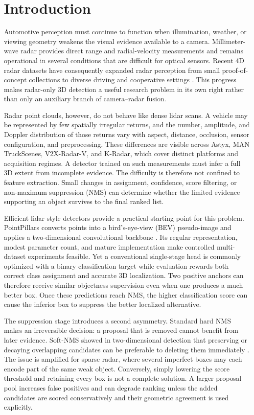 \documentclass[final,5p,times]{elsarticle}
\begin{document}
\section{Introduction}

Automotive perception must continue to function when illumination, weather,
or viewing geometry weakens the visual evidence available to a camera.
Millimeter-wave radar provides direct range and radial-velocity measurements
and remains operational in several conditions that are difficult for optical
sensors. Recent 4D radar datasets have consequently expanded radar perception
from small proof-of-concept collections to diverse driving and cooperative
settings \cite{paek2022kradar,yang2024v2xradar}. This progress makes
radar-only 3D detection a useful research problem in its own right rather than
only an auxiliary branch of camera--radar fusion.

Radar point clouds, however, do not behave like dense lidar scans. A vehicle
may be represented by few spatially irregular returns, and the number,
amplitude, and Doppler distribution of those returns vary with aspect,
distance, occlusion, sensor configuration, and preprocessing. These
differences are visible across Astyx, MAN TruckScenes, V2X-Radar-V, and
K-Radar, which cover distinct platforms and acquisition regimes. A detector
trained on such measurements must infer a full 3D extent from incomplete
evidence. The difficulty is therefore not confined to feature extraction.
Small changes in assignment, confidence, score filtering, or non-maximum
suppression (NMS) can determine whether the limited evidence supporting an
object survives to the final ranked list.

Efficient lidar-style detectors provide a practical starting point for this
problem. PointPillars converts points into a bird's-eye-view (BEV) pseudo-image
and applies a two-dimensional convolutional backbone
\cite{lang2019pointpillars}. Its regular representation, modest parameter
count, and mature implementation make controlled multi-dataset experiments
feasible. Yet a conventional single-stage head is commonly optimized with a
binary classification target while evaluation rewards both correct class
assignment and accurate 3D localization. Two positive anchors can therefore
receive similar objectness supervision even when one produces a much better
box. Once these predictions reach NMS, the higher classification score can
cause the inferior box to suppress the better localized alternative.

The suppression stage introduces a second asymmetry. Standard hard NMS makes
an irreversible decision: a proposal that is removed cannot benefit from
later evidence. Soft-NMS showed in two-dimensional detection that preserving
or decaying overlapping candidates can be preferable to deleting them
immediately \cite{bodla2017softnms}. The issue is amplified for sparse radar,
where several imperfect boxes may each encode part of the same weak object.
Conversely, simply lowering the score threshold and retaining every box is not
a complete solution. A larger proposal pool increases false positives and can
degrade ranking unless the added candidates are scored conservatively and
their geometric agreement is used explicitly.
\end{document}

